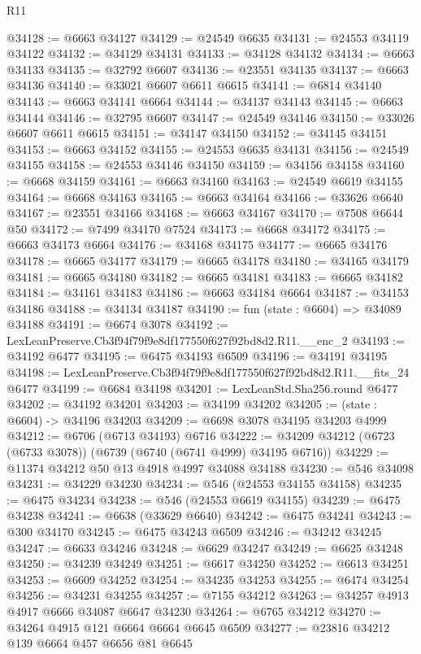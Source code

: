 \begin{lexlean}{R11}
\begin{coremodule}
@34128 := @6663 @34127
@34129 := @24549 @6635
@34131 := @24553 @34119 @34122
@34132 := @34129 @34131
@34133 := @34128 @34132
@34134 := @6663 @34133
@34135 := @32792 @6607
@34136 := @23551 @34135
@34137 := @6663 @34136
@34140 := @33021 @6607 @6611 @6615
@34141 := @6814 @34140
@34143 := @6663 @34141 @6664
@34144 := @34137 @34143
@34145 := @6663 @34144
@34146 := @32795 @6607
@34147 := @24549 @34146
@34150 := @33026 @6607 @6611 @6615
@34151 := @34147 @34150
@34152 := @34145 @34151
@34153 := @6663 @34152
@34155 := @24553 @6635 @34131
@34156 := @24549 @34155
@34158 := @24553 @34146 @34150
@34159 := @34156 @34158
@34160 := @6668 @34159
@34161 := @6663 @34160
@34163 := @24549 @6619 @34155
@34164 := @6668 @34163
@34165 := @6663 @34164
@34166 := @33626 @6640
@34167 := @23551 @34166
@34168 := @6663 @34167
@34170 := @7508 @6644 @50
@34172 := @7499 @34170 @7524
@34173 := @6668 @34172
@34175 := @6663 @34173 @6664
@34176 := @34168 @34175
@34177 := @6665 @34176
@34178 := @6665 @34177
@34179 := @6665 @34178
@34180 := @34165 @34179
@34181 := @6665 @34180
@34182 := @6665 @34181
@34183 := @6665 @34182
@34184 := @34161 @34183
@34186 := @6663 @34184 @6664
@34187 := @34153 @34186
@34188 := @34134 @34187
@34190 := fun (state : @6604) => @34089 @34188
@34191 := @6674 @3078
@34192 := LexLeanPreserve.Cb3f94f79f9e8df177550f627f92bd8d2.R11.__enc_2
@34193 := @34192 @6477
@34195 := @6475 @34193 @6509
@34196 := @34191 @34195
@34198 := LexLeanPreserve.Cb3f94f79f9e8df177550f627f92bd8d2.R11.__fits_24 @6477
@34199 := @6684 @34198
@34201 := LexLeanStd.Sha256.round @6477
@34202 := @34192 @34201
@34203 := @34199 @34202
@34205 := (state : @6604) -> @34196 @34203
@34209 := @6698 @3078 @34195 @34203 @4999
@34212 := @6706 (@6713 @34193) @6716
@34222 := @34209 @34212 (@6723 (@6733 @3078)) (@6739 (@6740 (@6741 @4999) @34195 @6716))
@34229 := @11374 @34212 @50 @13 @4918 @4997 @34088 @34188
@34230 := @546 @34098
@34231 := @34229 @34230
@34234 := @546 (@24553 @34155 @34158)
@34235 := @6475 @34234
@34238 := @546 (@24553 @6619 @34155)
@34239 := @6475 @34238
@34241 := @6638 (@33629 @6640)
@34242 := @6475 @34241
@34243 := @300 @34170
@34245 := @6475 @34243 @6509
@34246 := @34242 @34245
@34247 := @6633 @34246
@34248 := @6629 @34247
@34249 := @6625 @34248
@34250 := @34239 @34249
@34251 := @6617 @34250
@34252 := @6613 @34251
@34253 := @6609 @34252
@34254 := @34235 @34253
@34255 := @6474 @34254
@34256 := @34231 @34255
@34257 := @7155 @34212
@34263 := @34257 @4913 @4917 @6666 @34087 @6647 @34230
@34264 := @6765 @34212
@34270 := @34264 @4915 @121 @6664 @6664 @6645 @6509
@34277 := @23816 @34212 @139 @6664 @457 @6656 @81 @6645

\end{coremodule}
\end{lexlean}
